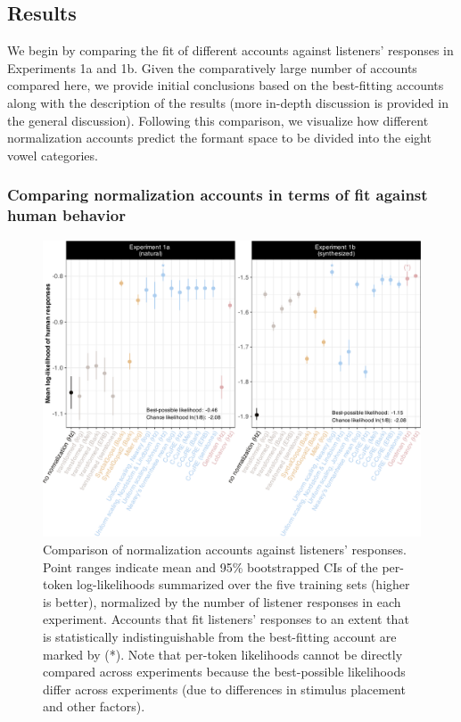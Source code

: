 \documentclass[preprint]{JASA}
\begin{document}
\subsection{Results}\label{results}

We begin by comparing the fit of different accounts against listeners' responses in Experiments 1a and 1b. Given the comparatively large number of accounts compared here, we provide initial conclusions based on the best-fitting accounts along with the description of the results (more in-depth discussion is provided in the general discussion). Following this comparison, we visualize how different normalization accounts predict the formant space to be divided into the eight vowel categories.

\subsubsection{Comparing normalization accounts in terms of fit against human behavior}\label{comparing-normalization-accounts-in-terms-of-fit-against-human-behavior}



\begin{figure}[!ht]

{\centering \includegraphics[width=0.95\linewidth]{./Figure9} 

}

\caption{Comparison of normalization accounts against listeners' responses. Point ranges indicate mean and 95\% bootstrapped CIs of the per-token log-likelihoods summarized over the five training sets (higher is better), normalized by the number of listener responses in each experiment. Accounts that fit listeners' responses to an extent that is statistically indistinguishable from the best-fitting account are marked by (*). Note that per-token likelihoods cannot be directly compared across experiments because the best-possible likelihoods differ across experiments (due to differences in stimulus placement and other factors).}\label{fig:plot-io-optimal}
\end{figure}
\end{document}
